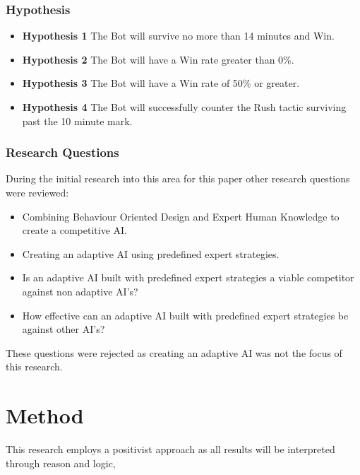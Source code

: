 \documentclass[journal]{IEEEtran}
\begin{document}
\subsubsection{Hypothesis}
\begin{itemize}
	\item \textbf{Hypothesis 1} The Bot will survive no more than 14 minutes and Win.
	\item \textbf{Hypothesis 2} The Bot will have a Win rate greater than 0\%.
	\item \textbf{Hypothesis 3} The Bot will have a Win rate of 50\% or greater.	
	\item \textbf{Hypothesis 4} The Bot will successfully counter the Rush tactic surviving past the 10 minute mark.
\end{itemize}

\subsubsection{Research Questions}
During the initial research into this area for this paper other research questions were reviewed:
\begin{itemize}
	\item Combining Behaviour Oriented Design and Expert Human Knowledge to create a competitive AI.
	
	\item Creating an adaptive AI using predefined expert strategies. 
	
	\item Is an adaptive AI built with predefined expert strategies a viable competitor against non adaptive AI’s?
	
	\item How effective can an adaptive AI built with predefined expert strategies be against other AI’s?	
\end{itemize}
These questions were rejected as creating an adaptive AI was not the focus of this research.
\newline

\section{Method}


This research employs a positivist approach as all results will be interpreted through reason and logic, 
\end{document}
